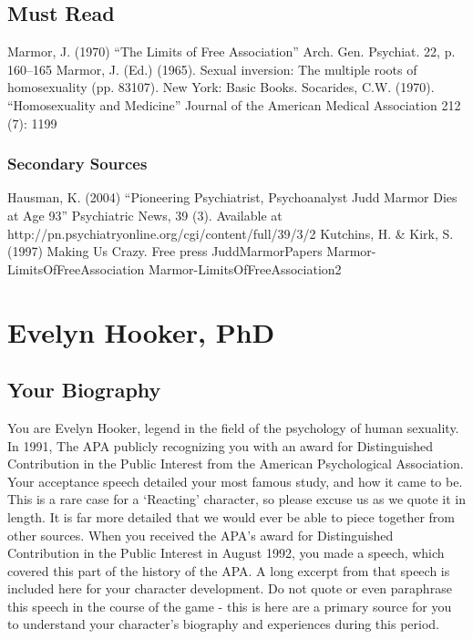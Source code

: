 \section{Must Read}
\label{mustread}

Marmor, J. (1970) “The Limits of Free Association” Arch. Gen. Psychiat. 22, p. 160--165
Marmor, J. (Ed.) (1965). Sexual inversion: The multiple roots of homosexuality (pp. 83107). New York: Basic Books.
Socarides, C.W. (1970). “Homosexuality and Medicine” Journal of the American Medical Association 212 (7): 1199

\subsection{Secondary Sources}
\label{secondarysources}

Hausman, K. (2004) “Pioneering Psychiatrist, Psychoanalyst Judd Marmor Dies at Age 93” Psychiatric News, 39 (3). Available at http:\slash \slash pn.psychiatryonline.org\slash cgi\slash content\slash full\slash 39\slash 3\slash 2
Kutchins, H. \& Kirk, S. (1997) Making Us Crazy. Free press
JuddMarmorPapers
Marmor-LimitsOfFreeAssociation
Marmor-LimitsOfFreeAssociation2

\chapter{Evelyn Hooker, PhD}
\label{evelynhookerphd}

\section{Your Biography}
\label{yourbiography}

You are Evelyn Hooker, legend in the field of the psychology of human sexuality. In 1991, The APA publicly recognizing you with an award for Distinguished Contribution in the Public Interest from the American Psychological Association. Your acceptance speech detailed your most famous study, and how it came to be. This is a rare case for a `Reacting' character, so please excuse us as we quote it in length. It is far more detailed that we would ever be able to piece together from other sources.
When you received the APA’s award for Distinguished Contribution in the Public Interest in August 1992, you made a speech, which covered this part of the history of the APA. A long excerpt from that speech is included here for your character development. Do not quote or even paraphrase this speech in the course of the game - this is here are a primary source for you to understand your character’s biography and experiences during this period.

